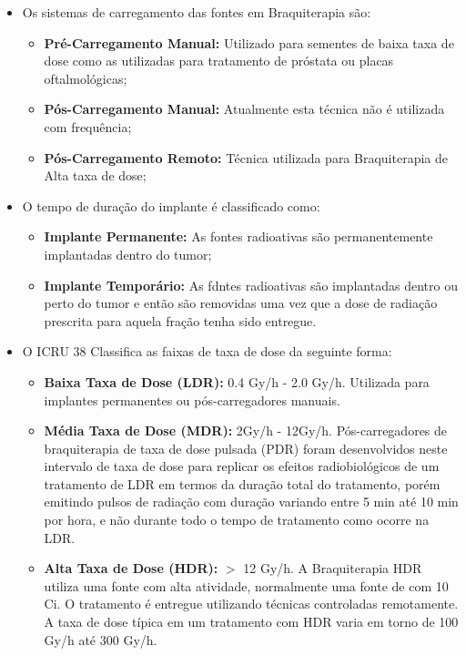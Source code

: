 \documentclass[11pt,a4paper]{article}
\newcounter{exemplo}
\begin{document}
\begin{exemplo}[8. Braquiterapia]
\begin{itemize}
        \item Os sistemas de carregamento das fontes em Braquiterapia são:
        
            \begin{itemize}[label=\textopenbullet]
                \item \textcolor{CarnationPink}{\textbf{Pré-Carregamento Manual:}} Utilizado para sementes de baixa taxa de dose como as utilizadas para tratamento de próstata ou placas oftalmológicas;
                \item \textcolor{CarnationPink}{\textbf{Pós-Carregamento Manual:}}  Atualmente esta técnica não é utilizada com frequência;
                \item \textcolor{CarnationPink}{\textbf{Pós-Carregamento Remoto:}} Técnica utilizada para Braquiterapia de Alta taxa de dose;
            \end{itemize}

        \item O tempo de duração do implante é classificado como:
        
            \begin{itemize}[label=\textopenbullet]
                \item \textcolor{CarnationPink}{\textbf{Implante Permanente:}} As fontes radioativas são permanentemente implantadas dentro do tumor;
                \item \textcolor{CarnationPink}{\textbf{Implante Temporário:}} As fdntes radioativas são implantadas dentro ou perto do tumor e então são removidas uma vez que a dose de radiação prescrita para aquela fração tenha sido entregue.
            \end{itemize}

        \item O ICRU 38 Classifica as faixas de taxa de dose da seguinte forma:
        
            \begin{itemize}[label=\textopenbullet]
                \item \textcolor{CarnationPink}{\textbf{Baixa Taxa de Dose (LDR):}} 0.4 Gy/h - 2.0 Gy/h. Utilizada para implantes permanentes ou pós-carregadores manuais. 
                \item \textcolor{CarnationPink}{\textbf{Média Taxa de Dose (MDR):}} 2Gy/h - 12Gy/h. Pós-carregadores de braquiterapia de taxa de dose pulsada (PDR) foram desenvolvidos neste intervalo de taxa de dose para replicar os efeitos radiobiológicos de um tratamento de LDR em termos da duração total do tratamento, porém emitindo pulsos de radiação com duração variando entre 5 min até 10 min por hora, e não durante todo o tempo de tratamento como ocorre na LDR.
                \item \textcolor{CarnationPink}{\textbf{Alta Taxa de Dose (HDR):}} $>$ 12 Gy/h. A Braquiterapia HDR utiliza uma fonte com alta atividade, normalmente uma fonte de  com 10 Ci. O tratamento é entregue utilizando técnicas controladas remotamente. A taxa de dose típica em um tratamento com HDR varia em torno de 100 Gy/h até 300 Gy/h.
            \end{itemize}


\end{itemize}
\end{exemplo}
\end{document}
